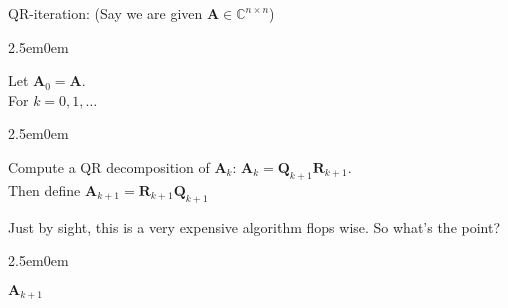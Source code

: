 \documentclass{book}
\newcommand{\hTwo}{%
   \color{MidnightBlue}%
   \fontsize{13}{15}\selectfont%
}
\newcommand{\hThree}{%
   \color{PineGreen}
   \fontsize{13}{15}\selectfont%
}
\newcommand{\hFour}{%
   \color{Cerulean}
   \fontsize{12}{14}\selectfont%
}
\newcommand{\myComment}{%
   \color{RawerSienna}%
   \fontsize{12}{14}\selectfont%
}
\newenvironment{myIndent}{%
   \begin{adjustwidth}{2.5em}{0em}%
}{%
   \end{adjustwidth}%
}
\newcommand{\retTwo}{\hfill\bigbreak}
\newcommand{\mMat}[1]{\mathbf{#1}}
\begin{document}
   QR-iteration: (Say we are given $\mMat{A} \in \mathbb{C}^{n\times n}$)
   {\begin{myIndent} \hTwo
      Let $\mMat{A}_0 = \mMat{A}$.\\
      For $k = 0, 1, \ldots$
      \begin{myIndent}
         Compute a QR decomposition of $\mMat{A}_k$: $\mMat{A}_k = \mMat{Q}_{k+1}\mMat{R}_{k+1}$.\\
         Then define $\mMat{A}_{k+1} = \mMat{R}_{k+1}\mMat{Q}_{k+1}$ \retTwo
      \end{myIndent}


      \hThree Just by sight, this is a very expensive algorithm flops wise. So what's the point?
      {\begin{myIndent} \hFour
         $\mMat{A}_{k+1}$
      \end{myIndent}}

   \end{myIndent}}
\end{document}
